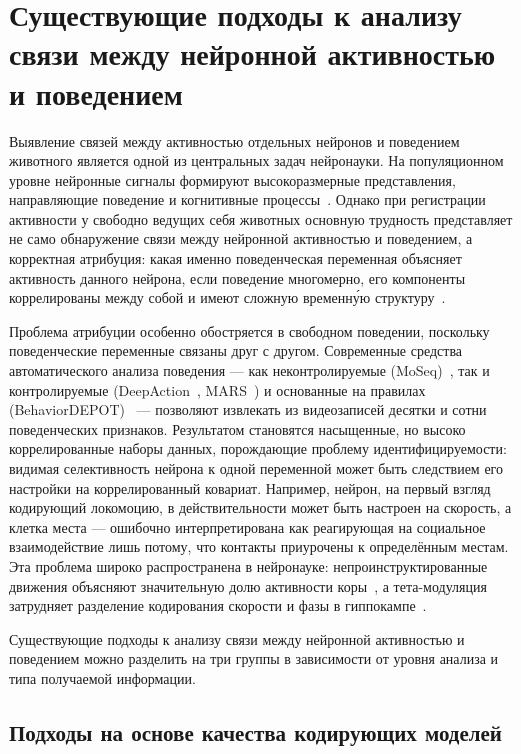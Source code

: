 \section{Существующие подходы к анализу связи между нейронной активностью и поведением}
\label{sec:behavior_encoding}

Выявление связей между активностью отдельных нейронов и поведением животного является одной из центральных задач нейронауки.
На популяционном уровне нейронные сигналы формируют высокоразмерные представления, направляющие поведение и когнитивные процессы~\cite{Averbeck2006}.
Однако при регистрации активности у свободно ведущих себя животных основную трудность представляет не само обнаружение связи между нейронной активностью и поведением, а корректная атрибуция: какая именно поведенческая переменная объясняет активность данного нейрона, если поведение многомерно, его компоненты коррелированы между собой и имеют сложную временн\'{у}ю структуру~\cite{Kriegeskorte2019}.

Проблема атрибуции особенно обостряется в свободном поведении, поскольку поведенческие переменные связаны друг с другом.
Современные средства автоматического анализа поведения --- как неконтролируемые (MoSeq)~\cite{Weinreb2024}, так и контролируемые (DeepAction~\cite{Harris2023deepaction}, MARS~\cite{Segalin2021}) и основанные на правилах (BehaviorDEPOT)~\cite{Gabriel2022} --- позволяют извлекать из видеозаписей десятки и сотни поведенческих признаков. Результатом становятся насыщенные, но высоко коррелированные наборы данных, порождающие проблему идентифицируемости: видимая селективность нейрона к одной переменной может быть следствием его настройки на коррелированный ковариат.
Например, нейрон, на первый взгляд кодирующий локомоцию, в действительности может быть настроен на скорость, а клетка места --- ошибочно интерпретирована как реагирующая на социальное взаимодействие лишь потому, что контакты приурочены к определённым местам. Эта проблема широко распространена в нейронауке: непроинструктированные движения объясняют значительную долю активности коры~\cite{Musall2019}, а тета-модуляция затрудняет разделение кодирования скорости и фазы в гиппокампе~\cite{Vanderwolf1969, McNaughton1983}.

Существующие подходы к анализу связи между нейронной активностью и поведением можно разделить на три группы в зависимости от уровня анализа и типа получаемой информации.


\subsection{Подходы на основе качества кодирующих моделей}
\label{sec:decoding_approaches}

